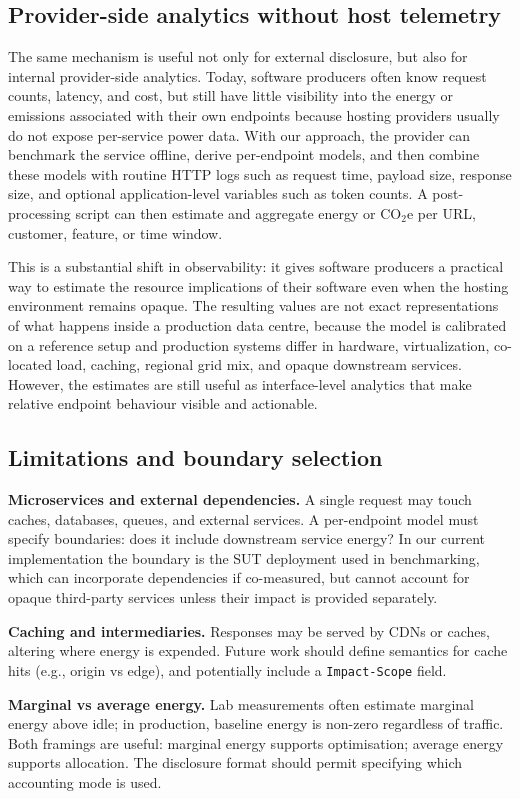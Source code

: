 \subsection{Provider-side analytics without host telemetry}
The same mechanism is useful not only for external disclosure, but also for internal provider-side analytics. Today, software producers often know request counts, latency, and cost, but still have little visibility into the energy or emissions associated with their own endpoints because hosting providers usually do not expose per-service power data. With our approach, the provider can benchmark the service offline, derive per-endpoint models, and then combine these models with routine HTTP logs such as request time, payload size, response size, and optional application-level variables such as token counts. A post-processing script can then estimate and aggregate energy or \(\mathrm{CO_2e}\) per URL, customer, feature, or time window.

This is a substantial shift in observability: it gives software producers a practical way to estimate the resource implications of their software even when the hosting environment remains opaque. The resulting values are not exact representations of what happens inside a production data centre, because the model is calibrated on a reference setup and production systems differ in hardware, virtualization, co-located load, caching, regional grid mix, and opaque downstream services. However, the estimates are still useful as interface-level analytics that make relative endpoint behaviour visible and actionable.

\subsection{Limitations and boundary selection}
\textbf{Microservices and external dependencies.} A single request may touch caches, databases, queues, and external services. A per-endpoint model must specify boundaries: does it include downstream service energy? In our current implementation the boundary is the SUT deployment used in benchmarking, which can incorporate dependencies if co-measured, but cannot account for opaque third-party services unless their impact is provided separately.

\textbf{Caching and intermediaries.} Responses may be served by CDNs or caches, altering where energy is expended. Future work should define semantics for cache hits (e.g., origin vs edge), and potentially include a \texttt{Impact-Scope} field.

\textbf{Marginal vs average energy.} Lab measurements often estimate marginal energy above idle; in production, baseline energy is non-zero regardless of traffic. Both framings are useful: marginal energy supports optimisation; average energy supports allocation. The disclosure format should permit specifying which accounting mode is used.




